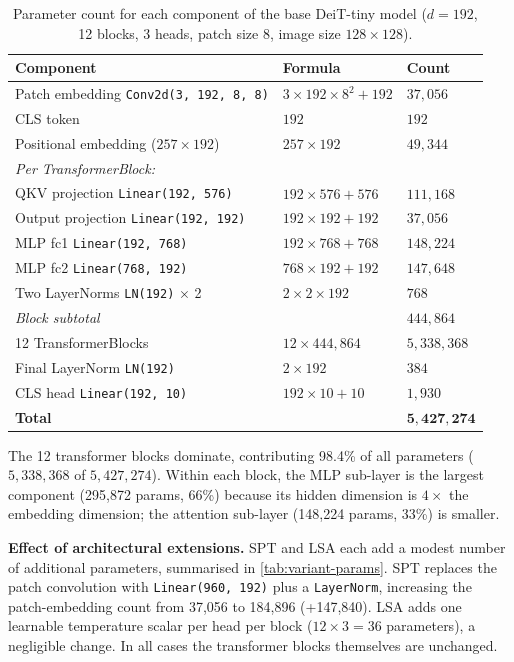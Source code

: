 \documentclass[11pt]{article}
\begin{document}
\begin{table}[H]
\centering
\small
\begin{tabular}{lll}
\toprule
\textbf{Component} & \textbf{Formula} & \textbf{Count} \\
\midrule
Patch embedding \texttt{Conv2d(3, 192, 8, 8)} & $3 \times 192 \times 8^2 + 192$ & $37{,}056$ \\
CLS token & $192$ & $192$ \\
Positional embedding ($257 \times 192$) & $257 \times 192$ & $49{,}344$ \\
\midrule
\emph{Per TransformerBlock:} & & \\
\quad QKV projection \texttt{Linear(192, 576)} & $192 \times 576 + 576$ & $111{,}168$ \\
\quad Output projection \texttt{Linear(192, 192)} & $192 \times 192 + 192$ & $37{,}056$ \\
\quad MLP fc1 \texttt{Linear(192, 768)} & $192 \times 768 + 768$ & $148{,}224$ \\
\quad MLP fc2 \texttt{Linear(768, 192)} & $768 \times 192 + 192$ & $147{,}648$ \\
\quad Two LayerNorms \texttt{LN(192)} $\times$ 2 & $2 \times 2 \times 192$ & $768$ \\
\quad \emph{Block subtotal} & & \emph{$444{,}864$} \\
\midrule
12 TransformerBlocks & $12 \times 444{,}864$ & $5{,}338{,}368$ \\
\midrule
Final LayerNorm \texttt{LN(192)} & $2 \times 192$ & $384$ \\
CLS head \texttt{Linear(192, 10)} & $192 \times 10 + 10$ & $1{,}930$ \\
\midrule
\textbf{Total} & & $\mathbf{5{,}427{,}274}$ \\
\bottomrule
\end{tabular}
\caption{Parameter count for each component of the base DeiT-tiny model ($d=192$, 12 blocks, 3 heads, patch size 8, image size $128\times128$).}
\label{tab:param-count}
\end{table}

The 12 transformer blocks dominate, contributing 98.4\% of all parameters ($5{,}338{,}368$ of $5{,}427{,}274$). Within each block, the MLP sub-layer is the largest component (295,872 params, 66\%) because its hidden dimension is $4\times$ the embedding dimension; the attention sub-layer (148,224 params, 33\%) is smaller.

\textbf{Effect of architectural extensions.} SPT and LSA each add a modest number of additional parameters, summarised in \autoref{tab:variant-params}. SPT replaces the patch convolution with \texttt{Linear(960, 192)} plus a \texttt{LayerNorm}, increasing the patch-embedding count from 37,056 to 184,896 (+147,840). LSA adds one learnable temperature scalar per head per block ($12 \times 3 = 36$ parameters), a negligible change. In all cases the transformer blocks themselves are unchanged.
\end{document}

